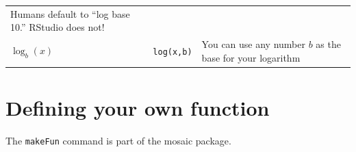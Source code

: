 \documentclass[
]{book}
\begin{document}
\begin{longtable}[]{@{}lll@{}}
\begin{minipage}[t]{0.30\columnwidth}
Humans default to ``log base 10.'' RStudio does not!\strut
\end{minipage}\tabularnewline
\begin{minipage}[t]{0.30\columnwidth}\raggedright
\(\log_{b}(x)\)\strut
\end{minipage} & \begin{minipage}[t]{0.30\columnwidth}\raggedright
\texttt{log(x,b)}\strut
\end{minipage} & \begin{minipage}[t]{0.30\columnwidth}\raggedright
You can use any number \(b\) as the base for your logarithm\strut
\end{minipage}\tabularnewline
\bottomrule
\end{longtable}

\hypertarget{defining-your-own-function}{%
\section{Defining your own function}\label{defining-your-own-function}}

The \texttt{makeFun} command is part of the mosaic package.
\end{document}
